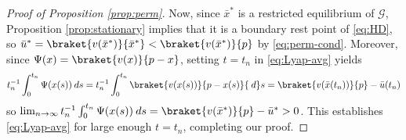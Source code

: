 \documentclass[reqno]{amsart}
\theoremstyle{plain}
\theoremstyle{definition}
\theoremstyle{remark}
\numberwithin{equation}{section}
\numberwithin{theorem}{section}
\begin{document}
\begin{proof}[Proof of Proposition \ref{prop:perm}]
Now, since ${\bar x^{\ast}}$ is a restricted equilibrium of ${\mathcal{G}}$, Proposition \ref{prop:stationary} implies that it is a boundary rest point of \eqref{eq:HD}, so $\bar u^{\ast} = \braket{{v}({\bar x^{\ast}})}{\bar x^{\ast}} < \braket{{v}({\bar x^{\ast}})}{p}$ by \eqref{eq:perm-cond}.
Moreover, since $\Psi(x) = \braket{{v}(x)}{p - x}$, setting $t=t_{n}$ in \eqref{eq:Lyap-avg} yields
\begin{equation}
t_{n}^{-1}\int_{0}^{t_{n}} \Psi(x(s)) {\:d} s
	= t_{n}^{-1} \int_{0}^{t_{n}} \braket{{v}(x(s))}{p - x(s)} {\:d} s
	= \braket{{v}(\bar x(t_{n}))}{p} - \bar u(t_{n})
\end{equation}
so $\lim_{n\to\infty} t_{n}^{-1} \int_{0}^{t_{n}} \Psi(x(s)) {\:d} s = \braket{{v}({\bar x^{\ast}})}{p} - \bar u^{\ast} > 0$.
This establishes \eqref{eq:Lyap-avg} for large enough $t = t_{n}$, completing our proof.
\end{proof}



\end{document}
